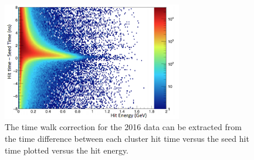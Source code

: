 \begin{figure}[htb]
  \centering
      \includegraphics[width=0.7\textwidth]{pics/performance/hittimeincluster.png}
  \caption[Hit times in a cluster versus the hit energy]{The time walk correction for the 2016 data can be extracted from the time difference between each cluster hit time versus the seed hit time plotted versus the hit energy.}
  \label{Figure:hittimeincluster}
\end{figure}

